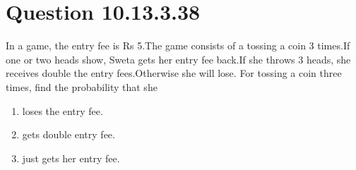 \documentclass[journal,12pt,twocolumn]{IEEEtran}
\theoremstyle{remark}
\begin{document}
\section{Question 10.13.3.38}In a game, the entry fee is Rs 5.The game consists of a tossing a coin 3 times.If one or two heads show, Sweta gets her entry fee back.If she throws 3 heads, she receives double the entry fees.Otherwise she will lose. For tossing a coin three times, find the probability that she
\begin{enumerate}
	\item loses the entry fee.

	\item gets double entry fee.

	\item just gets her entry fee.
\end{enumerate}
\end{document}
